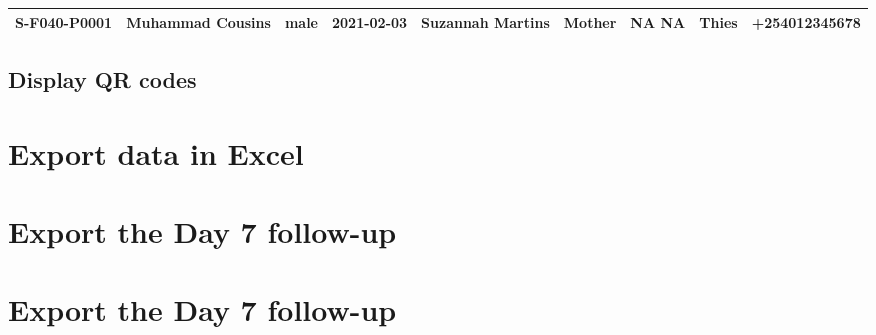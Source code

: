 \documentclass[
]{article}
\begin{document}
\begin{longtable}[]{@{}lllllllll@{}}
\begin{minipage}[t]{0.07\columnwidth}
S-F040-P0001\strut
\end{minipage} & \begin{minipage}[t]{0.09\columnwidth}\raggedright
Muhammad Cousins\strut
\end{minipage} & \begin{minipage}[t]{0.04\columnwidth}\raggedright
male\strut
\end{minipage} & \begin{minipage}[t]{0.06\columnwidth}\raggedright
2021-02-03\strut
\end{minipage} & \begin{minipage}[t]{0.09\columnwidth}\raggedright
Suzannah Martins\strut
\end{minipage} & \begin{minipage}[t]{0.20\columnwidth}\raggedright
Mother\strut
\end{minipage} & \begin{minipage}[t]{0.07\columnwidth}\raggedright
NA NA\strut
\end{minipage} & \begin{minipage}[t]{0.07\columnwidth}\raggedright
Thies\strut
\end{minipage} & \begin{minipage}[t]{0.07\columnwidth}\raggedright
+254012345678\strut
\end{minipage}\tabularnewline
\bottomrule
\end{longtable}

\hypertarget{display-qr-codes}{%
\subsection{Display QR codes}\label{display-qr-codes}}

\hypertarget{export-data-in-excel}{%
\section{Export data in Excel}\label{export-data-in-excel}}

\hypertarget{export-the-day-7-follow-up}{%
\section{Export the Day 7 follow-up}\label{export-the-day-7-follow-up}}

\hypertarget{export-the-day-7-follow-up-1}{%
\section{Export the Day 7
follow-up}\label{export-the-day-7-follow-up-1}}
\end{document}
